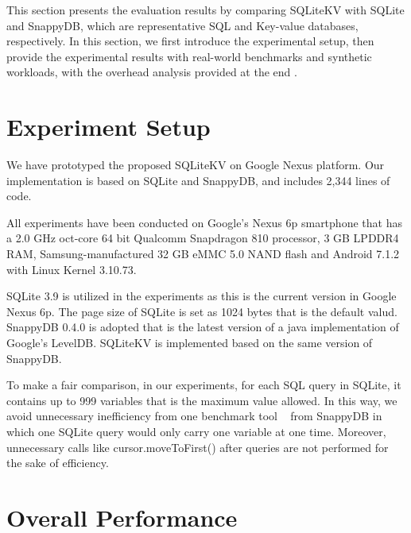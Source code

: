 
This section presents the evaluation results by comparing SQLiteKV with SQLite and SnappyDB, which are representative SQL and Key-value databases, respectively. In this section, we first introduce the experimental setup, then provide the experimental results with real-world benchmarks and synthetic workloads, with the overhead analysis provided at the end \cite{cooper2010benchmarking}.
\section{Experiment Setup}
We have prototyped the proposed SQLiteKV on Google Nexus platform. Our implementation is based on SQLite and SnappyDB, and includes 2,344 lines of code. 

All experiments have been conducted on Google’s Nexus 6p smartphone that has a 2.0 GHz oct-core 64 bit Qualcomm Snapdragon 810 processor, 3 GB LPDDR4 RAM, Samsung-manufactured 32 GB eMMC 5.0 NAND flash and Android 7.1.2 with Linux Kernel 3.10.73.

SQLite 3.9 is utilized in the experiments as this is the current version in Google Nexus 6p. The page size of SQLite is set as 1024 bytes that is the default valud. SnappyDB 0.4.0 is adopted that is the latest version of a java implementation of Google's LevelDB. SQLiteKV is implemented based on the same version of SnappyDB. 

To make a fair comparison, in our experiments, for each SQL query in SQLite, it contains up to 999 variables that is the maximum value allowed. In this way, we avoid unnecessary inefficiency from one benchmark tool ~\cite{SnappyDB} from SnappyDB in which one SQLite query would only carry one variable at one time. Moreover, unnecessary calls like cursor.moveToFirst() after queries are not performed for the sake of efficiency.

\section{Overall Performance}

